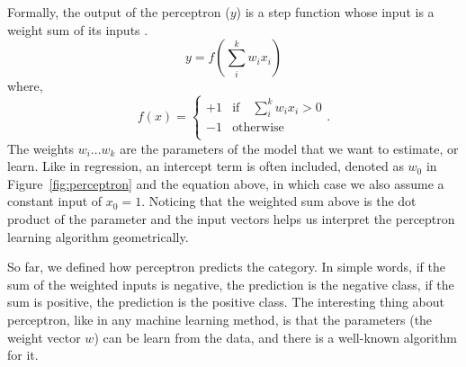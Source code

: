 Formally, the output of the perceptron ($y$) is a step
function whose input is a weight sum of its inputs .
\begin{equation*}
  y = f\left(\sum_{i}^{k} w_{i} x_{i}\right)
\end{equation*}
where,
\begin{equation*}
  f(x) = 
  \begin{cases}
    +1 & \text{if}\quad \sum_{i}^{k} w_{i} x_{i} > 0 \\
    -1 & \text{otherwise} \\
  \end{cases} .
\end{equation*}
The weights $w_{i}\ldots{}w_{k}$ are the parameters of the model that
we want to estimate, or learn.
Like in regression, an intercept term is often included,
denoted as $w_{0}$ in Figure~\ref{fig:perceptron} and the equation above,
in which case we also assume a constant input of $x_{0} = 1$.
Noticing that the weighted sum above
is the dot product of the parameter and the input vectors
helps us interpret the perceptron learning algorithm geometrically.

So far, we defined how perceptron predicts the category.
In simple words,
if the sum of the weighted inputs is negative,
the prediction is the negative class,
if the sum is positive, the prediction is the positive class.%
The interesting thing about perceptron,
like in any machine learning method,
is that the parameters (the weight vector $w$) can be learn from the data,
and there is a well-known algorithm for it.

